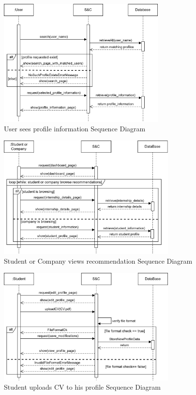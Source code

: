 \begin{figure}[H]
    \centering
    \includegraphics[width=0.75\textwidth]{Images/Sequence_Diagrams/seeProfile_SD.png}
    \caption{User sees profile information Sequence Diagram}
\end{figure}
\begin{figure}[H]
    \centering
    \includegraphics[width=0.8\textwidth]{Images/Sequence_Diagrams/recommendation_SD.png}
    \caption{Student or Company views recommendation Sequence Diagram}
\end{figure}
\begin{figure}[H]
    \centering
    \includegraphics[width=0.8\textwidth]{Images/Sequence_Diagrams/uploadCV_SD.png}
    \caption{Student uploads CV to his profile Sequence Diagram}
\end{figure}
